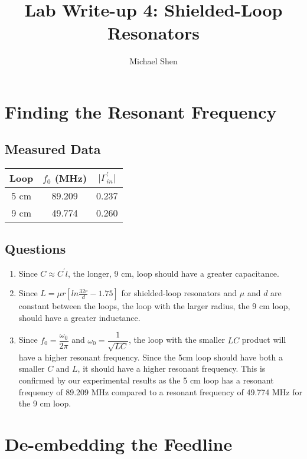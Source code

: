 \documentclass{article}
\begin{document}
\title{Lab Write-up 4: Shielded-Loop Resonators}
\author{Michael Shen}
\maketitle


\section{Finding the Resonant Frequency}

\subsection{Measured Data}

\begin{table}[H]
\centering
\begin{tabular}{|c|c|c|}
\hline
Loop & $f_0$ (MHz) & $\vert\Gamma^{\prime}_{in}\vert$ \\ \hline
5 cm & 89.209 & 0.237 \\ \hline
9 cm & 49.774 & 0.260 \\ \hline
\end{tabular}
\end{table}

\subsection{Questions}

\begin{enumerate}
	\item Since $C \approx C^{\prime}l$, the longer, 9 cm, loop should have a greater capacitance.
	\item Since $L = \mu r [ln \frac{32r}{d}-1.75]$ for shielded-loop resonators and $\mu$ and $d$ are constant between the loops, the loop with the larger radius, the 9 cm loop, should have a greater inductance.
	\item Since $f_0 = \dfrac{\omega_0}{2\pi}$ and $\omega_0 = \dfrac{1}{\sqrt{LC}}$, the loop with the smaller $LC$ product will have a higher resonant frequency. Since the 5cm loop should have both a smaller $C$ and $L$, it should have a higher resonant frequency. This is confirmed by our experimental results as the 5 cm loop has a resonant frequency of 89.209 MHz compared to a resonant frequency of 49.774 MHz for the 9 cm loop.
\end{enumerate}


\section{De-embedding the Feedline}
\end{document}
